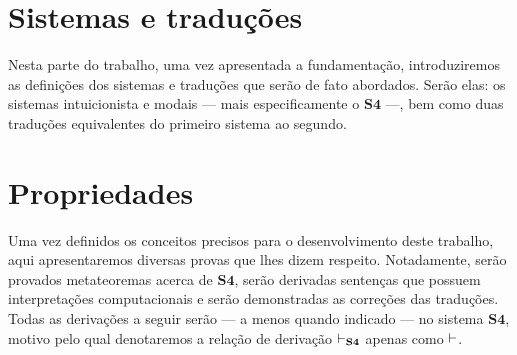     \tableofcontents

    
    
    

    \chapter{Sistemas e traduções}

        Nesta parte do trabalho, uma vez apresentada a fundamentação, introduziremos as definições dos sistemas e traduções que serão de fato abordados. Serão elas: os sistemas intuicionista  e modais --- mais especificamente o $\mathbf{S4}$ ---, bem como duas traduções equivalentes do primeiro sistema ao segundo.

        
        
        

    \chapter{Propriedades}
        Uma vez definidos os conceitos precisos para o desenvolvimento deste trabalho, aqui apresentaremos diversas provas que lhes dizem respeito. Notadamente, serão provados metateoremas acerca de $\mathbf{S4}$, serão derivadas sentenças que possuem interpretações computacionais e serão demonstradas as correções das traduções. Todas as derivações a seguir serão --- a menos quando indicado --- no sistema $\mathbf{S4}$, motivo pelo qual denotaremos a relação de derivação $\mathrel{\vdash}_{\mathbf{S4}}$ apenas como $\mathrel{\vdash}$.

        
        
        
        
        
        

    
    

